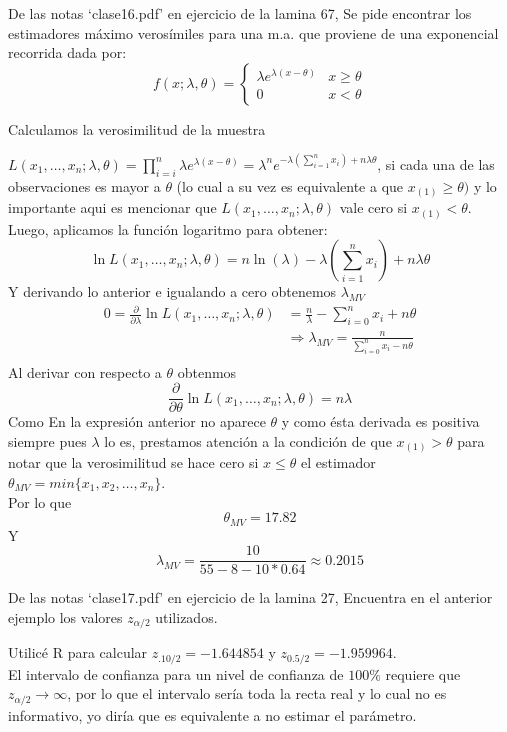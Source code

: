\documentclass[letter]{memoir} %
\newenvironment{cframe}[1][blue]
  {\begin{tcolorbox}[colframe=#1,colback=white]}
  {\end{tcolorbox}}
\begin{document}
\begin{enumerate}
\begin{cframe}[teal]
\item  De las notas ‘clase16.pdf’ en ejercicio de la lamina 67, Se pide encontrar los estimadores máximo verosímiles para una m.a. que proviene de una exponencial recorrida dada por:\\
	\[
			f(x; \lambda, \theta )= \left\{ \begin{array}{ll}
							 \lambda e^{\lambda (x - \theta)} & x \geq \theta \\
                             0 & x < \theta
							\end{array}
					\right.
		\]
\end{cframe}
Calculamos la verosimilitud de la muestra 
	
			$L(x_1, \dots, x_n;\lambda, \theta) = \prod_{i=i}^n 	\lambda e^{\lambda (x - \theta)}	 = \lambda^ne^{-\lambda (\sum_{i=1}^nx_i) + n\lambda \theta}$, si cada una de las observaciones es mayor a $\theta$ (lo cual a su vez es equivalente a que $x_{(1)} \geq \theta)$ y lo importante aqui es mencionar que $ L(x_1, \dots, x_n;\lambda, \theta)$ vale cero si $x_{(1)} < \theta$.\\
            Luego, aplicamos la función logaritmo para obtener:
\[ \ln L(x_1, \dots, x_n;\lambda, \theta) =n \ln(\lambda) - \lambda(\sum_{i=1}^n x_i) + n\lambda \theta
\]
Y derivando lo anterior e igualando a cero obtenemos $\lambda_{MV}$
\[ 
\begin{split}
0 = \frac{\partial}{\partial \lambda  }\ln L(x_1, \dots, x_n;\lambda, \theta) & = \frac{n}{\lambda} - \sum_{i=0}^nx_i + n \theta  \\
		& \Rightarrow \lambda_{MV} = \frac{n}{\sum_{i=0}^nx_i - n\theta}\\
\end{split}
\]
Al derivar con respecto a $\theta$ obtenmos \[\frac{\partial}{\partial \theta}\ln L(x_1, \dots, x_n;\lambda, \theta) = n\lambda\]
Como En la expresión anterior no aparece $\theta$ y como ésta derivada es positiva siempre pues $\lambda$ lo es, prestamos atención a la condición de que $x_{(1)}>\theta$ para notar que la verosimilitud se hace cero si $x \leq \theta$ el estimador $\theta_{MV} = min\{x_1,x_2,\dots,x_n\}$.\\
Por lo que 
\[
\theta_{MV}= 17.82
\]
Y 
\[
\lambda_{MV}=\frac{10}{55-8-10*0.64} \approx 0.2015
\]


\begin{cframe}[violet]
\item  De las notas ‘clase17.pdf’ en ejercicio de la lamina 27, Encuentra en el anterior ejemplo los valores $z_{\alpha/2}$ utilizados.
\end{cframe}
Utilicé R para calcular $z_{.10/2} = -1.644854$ y $z_{0.5/2}=-1.959964$.\\
El intervalo de confianza para un nivel de confianza de $100\%$ requiere que $z_{\alpha/2} \rightarrow \infty $, por lo que el intervalo sería toda la recta real y lo cual no es informativo, yo diría que es equivalente a no estimar el parámetro. 



\end{enumerate}
\end{document}
